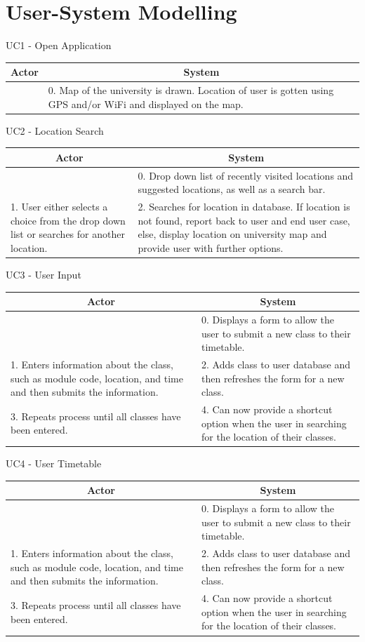 \documentclass[a4paper, 12pt, one column, aas_macros]{article}
\begin{document}
\section{User-System Modelling}
  UC1 - Open Application \hfill \break
  \begin{tabular}{ |p{5.5cm}|p{5.5cm}| }
    \hline
    \multicolumn{1}{|c|}{Actor} & \multicolumn{1}{c|}{System} \\ \hline
     & 0. Map of the university is drawn. Location of user is gotten using GPS and/or WiFi and displayed on the map. \\ \hline
  \end{tabular}
\hfill \break \hfill \break \hfill \break
  UC2 - Location Search \hfill \break
  \begin{tabular}{ |p{5.5cm}|p{5.5cm}| }
    \hline
    \multicolumn{1}{|c|}{Actor} & \multicolumn{1}{c|}{System} \\ \hline
     &0. Drop down list of recently visited locations and suggested locations, as well as a search bar.\\ \hline
     1. User either selects a choice from the drop down list or searches for another location. &2. Searches for location in database. If location is not found, report back to user and end user case, else, display location on university map and provide user with further options.\\ \hline
  \end{tabular}
\hfill \break \hfill \break \hfill \break
  UC3 - User Input \hfill \break
  \begin{tabular}{ |p{5.5cm}|p{5.5cm}| }
    \hline
    \multicolumn{1}{|c|}{Actor} & \multicolumn{1}{c|}{System} \\ \hline
     &0. Displays a form to allow the user to submit a new class to their timetable.\\ \hline
     1. Enters information about the class, such as module code, location, and time and then submits the information. &2. Adds class to user database and then refreshes the form for a new class.\\ \hline
     3. Repeats process until all classes have been entered. &4. Can now provide a shortcut option when the user in searching for the location of their classes.\\ \hline
  \end{tabular}

\newpage
  UC4 - User Timetable \hfill \break
  \begin{tabular}{ |p{5.5cm}|p{5.5cm}| }
    \hline
    \multicolumn{1}{|c|}{Actor} & \multicolumn{1}{c|}{System} \\ \hline
     &0. Displays a form to allow the user to submit a new class to their timetable.\\ \hline
     1. Enters information about the class, such as module code, location, and time and then submits the information. &2. Adds class to user database and then refreshes the form for a new class.\\ \hline
     3. Repeats process until all classes have been entered. &4. Can now provide a shortcut option when the user in searching for the location of their classes.\\ \hline
  \end{tabular}
\end{document}
